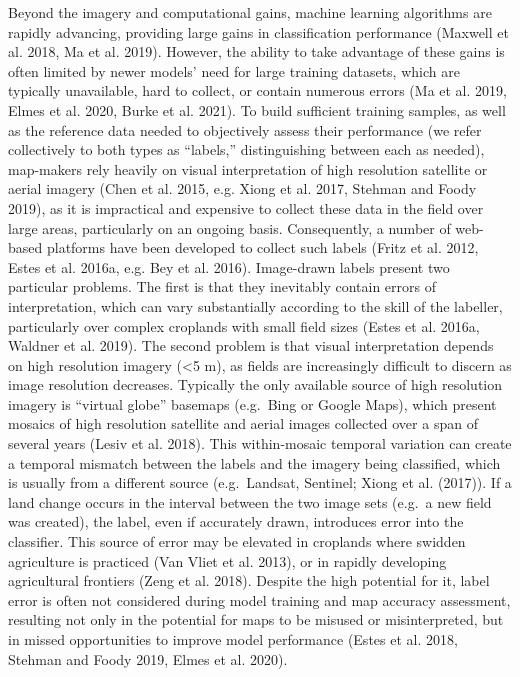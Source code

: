 \documentclass[11pt,a4paper]{article}
\begin{document}
Beyond the imagery and computational gains, machine learning algorithms
are rapidly advancing, providing large gains in classification
performance (Maxwell et al. 2018, Ma et al. 2019). However, the ability
to take advantage of these gains is often limited by newer models' need
for large training datasets, which are typically unavailable, hard to
collect, or contain numerous errors (Ma et al. 2019, Elmes et al. 2020,
Burke et al. 2021). To build sufficient training samples, as well as the
reference data needed to objectively assess their performance (we refer
collectively to both types as ``labels,'' distinguishing between each as
needed), map-makers rely heavily on visual interpretation of high
resolution satellite or aerial imagery (Chen et al. 2015, e.g. Xiong et
al. 2017, Stehman and Foody 2019), as it is impractical and expensive to
collect these data in the field over large areas, particularly on an
ongoing basis. Consequently, a number of web-based platforms have been
developed to collect such labels (Fritz et al. 2012, Estes et al. 2016a,
e.g. Bey et al. 2016). Image-drawn labels present two particular
problems. The first is that they inevitably contain errors of
interpretation, which can vary substantially according to the skill of
the labeller, particularly over complex croplands with small field sizes
(Estes et al. 2016a, Waldner et al. 2019). The second problem is that
visual interpretation depends on high resolution imagery (\textless5 m),
as fields are increasingly difficult to discern as image resolution
decreases. Typically the only available source of high resolution
imagery is ``virtual globe'' basemaps (e.g.~Bing or Google Maps), which
present mosaics of high resolution satellite and aerial images collected
over a span of several years (Lesiv et al. 2018). This within-mosaic
temporal variation can create a temporal mismatch between the labels and
the imagery being classified, which is usually from a different source
(e.g.~Landsat, Sentinel; Xiong et al. (2017)). If a land change occurs
in the interval between the two image sets (e.g.~a new field was
created), the label, even if accurately drawn, introduces error into the
classifier. This source of error may be elevated in croplands where
swidden agriculture is practiced (Van Vliet et al. 2013), or in rapidly
developing agricultural frontiers (Zeng et al. 2018). Despite the high
potential for it, label error is often not considered during model
training and map accuracy assessment, resulting not only in the
potential for maps to be misused or misinterpreted, but in missed
opportunities to improve model performance (Estes et al. 2018, Stehman
and Foody 2019, Elmes et al. 2020).
\end{document}
